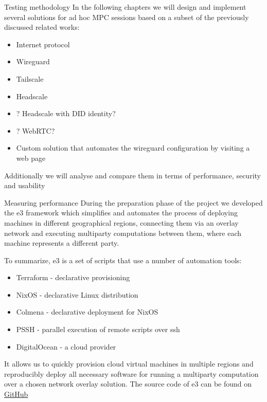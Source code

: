 \hypertarget{thesis__030-methods.md}{}
\begin{frame}{Testing methodology}
\protect\hypertarget{thesis__030-methods.md__testing-methodology}{}
In the following chapters we will design and implement several solutions
for ad hoc MPC sessions based on a subset of the previously discussed
related works:

\begin{itemize}
\tightlist
\item
  Internet protocol
\item
  Wireguard
\item
  Tailscale
\item
  Headscale
\item
  ? Headscale with DID identity?
\item
  ? WebRTC?
\item
  Custom solution that automates the wireguard configuration by visiting
  a web page
\end{itemize}

Additionally we will analyse and compare them in terms of performance,
security and usability

\begin{block}{Measuring performance}
\protect\hypertarget{thesis__030-methods.md__measuring-performance}{}
During the preparation phase of the project we developed the \gls{e3}
framework which simplifies and automates the process of deploying
machines in different geographical regions, connecting them via an
overlay network and executing multiparty computations between them,
where each machine represents a different party.

To summarize, \gls{e3} is a set of scripts that use a number of
automation tools:

\begin{itemize}
\tightlist
\item
  Terraform - declarative provisioning
\item
  NixOS - declarative Linux distribution
\item
  Colmena - declarative deployment for NixOS
\item
  PSSH - parallel execution of remote scripts over ssh
\item
  DigitalOcean - a cloud provider
\end{itemize}

It allows us to quickly provision cloud virtual machines in multiple
regions and reproducibly deploy all necessary software for running a
multiparty computation over a chosen network overlay solution. The
source code of \gls{e3} can be found on
\href{https://github.com/e-nikolov/mpyc}{GitHub}


\end{block}
\end{frame}
